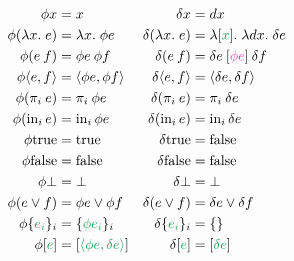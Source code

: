 \documentclass{rntz}\usepackage[a5]{rntzgeometry}\usepackage[fullwidth=130mm,width=330pt,]{narrow}
\newcommand\mathvar[1]{\ensuremath{#1}} %
\newcommand\isocolor{\color{ForestGreen}} %
\newcommand\fn\lambda
\newcommand\injc{\text{in}}
\newcommand\inj[1]{\injc_{#1}\,}
\newcommand\<{\mskip 4mu plus 4mu minus 1mu}
\newcommand\dx{\mathvar{dx}}
\newcommand\fnspace{\;}
\newcommand\fnof[1]{\fn{#1}.\fnspace}
\newcommand\kwname\textbf
\newcommand\eset[1]{\{{#1}\}}
\newcommand\etrue{\mathrm{true}}
\newcommand\efalse{\mathrm{false}}
\newcommand\ebox[1]{[{#1}]}
\newcommand\eboxd[1]{\ebox{\isocolor #1}}
\newcommand\esetd[1]{\eset{\isocolor #1}}
\newcommand\etuple[1]{\langle{#1}\rangle}
\newcommand\splitsum{\kwname{split}\<}
\begin{document}
\begin{figure*}
  \begin{align*}
    \phi x &= x & \delta x &= \dx\\
    \phi(\fnof x e) &= \fnof x \phi e
    & \delta(\fnof{x} e) &= \fnof{\eboxd x} \fnof\dx \delta e\\
    \phi(e\<f) &= \phi e\<\phi f
    & \delta(e\<f) &= \delta e \<\eboxd{\color{Rhodamine}\phi e} \<\delta f\\
    \phi\etuple{e,f} &= \etuple{\phi e, \phi f}
    & \delta\etuple{e,f} &= \etuple{\delta e, \delta f}\\
    \phi(\pi_i\<e) &= \pi_i\<\phi e
    & \delta(\pi_i\<e) &= \pi_i\<\delta e\\
    \phi(\inj i e) &= \inj i \phi e
    & \delta(\inj i e) &= \inj i \delta e\\
    \phi\etrue &= \etrue & \delta\etrue &= \efalse\\
    \phi\efalse &= \efalse & \delta\efalse &= \efalse\\
    \phi\bot &= \bot & \delta\bot &= \bot\\
    \phi(e \vee f) &= \phi e \vee \phi f
    & \delta(e \vee f) &= \delta e \vee \delta f\\
    \phi\esetd{e_i}_i &= \esetd{\phi e_i}_i & \delta\esetd{e_i}_i &= \esetd{}\\
    \phi\eboxd{e} &= \eboxd{\etuple{\phi e, \delta e}}
    & \delta\eboxd{e} &= \eboxd{\delta e}
  \end{align*}




\end{figure*}
\end{document}

